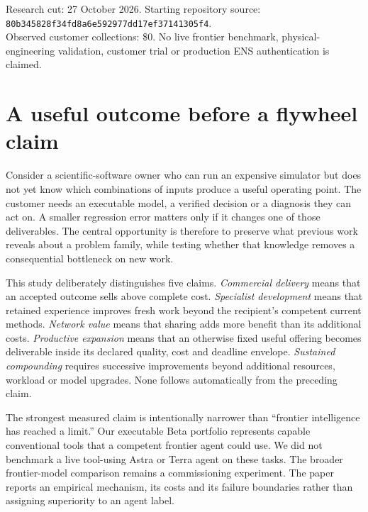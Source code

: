 \documentclass[11pt,letterpaper]{article}
\newcommand{\money}[1]{\$#1}
\begin{document}
\begin{titlepage}
\endgroup
\vfill
{\small\color{muted} Research cut: 27 October 2026. Starting repository source: \texttt{80b345828f34fd8a6e592977dd17ef37141305f4}.\\Observed customer collections: \money{0}. No live frontier benchmark, physical-engineering validation, customer trial or production ENS authentication is claimed.}
\end{titlepage}
\setcounter{page}{2}

\section{A useful outcome before a flywheel claim}

Consider a scientific-software owner who can run an expensive simulator but does not yet know which combinations of inputs produce a useful operating point. The customer needs an executable model, a verified decision or a diagnosis they can act on. A smaller regression error matters only if it changes one of those deliverables. The central opportunity is therefore to preserve what previous work reveals about a problem family, while testing whether that knowledge removes a consequential bottleneck on new work.

This study deliberately distinguishes five claims. \emph{Commercial delivery} means that an accepted outcome sells above complete cost. \emph{Specialist development} means that retained experience improves fresh work beyond the recipient's competent current methods. \emph{Network value} means that sharing adds more benefit than its additional costs. \emph{Productive expansion} means that an otherwise fixed useful offering becomes deliverable inside its declared quality, cost and deadline envelope. \emph{Sustained compounding} requires successive improvements beyond additional resources, workload or model upgrades. None follows automatically from the preceding claim.



The strongest measured claim is intentionally narrower than ``frontier intelligence has reached a limit.'' Our executable Beta portfolio represents capable conventional tools that a competent frontier agent could use. We did not benchmark a live tool-using Astra or Terra agent on these tasks. The broader frontier-model comparison remains a commissioning experiment. The paper reports an empirical mechanism, its costs and its failure boundaries rather than assigning superiority to an agent label.
\end{document}
